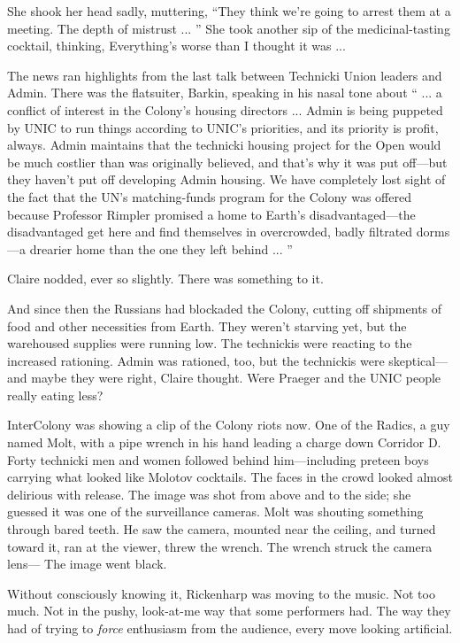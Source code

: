 She shook her head sadly, muttering, ``They think we're going to arrest them at a meeting. The depth of mistrust ... '' She took another sip of the medicinal-tasting cocktail, thinking, Everything's worse than I thought it was ...

The news ran highlights from the last talk between Technicki Union leaders and Admin. There was the flatsuiter, Barkin, speaking in his nasal tone about `` ... a conflict of interest in the Colony's housing directors ... Admin is being puppeted by UNIC to run things according to UNIC's priorities, and its priority is profit, always. Admin maintains that the technicki housing project for the Open would be much costlier than was originally believed, and that's why it was put off---but they haven't put off developing Admin housing. We have completely lost sight of the fact that the UN's matching-funds program for the Colony was offered because Professor Rimpler promised a home to Earth's disadvantaged---the disadvantaged get here and find themselves in overcrowded, badly filtrated dorms---a drearier home than the one they left behind ... ''

Claire nodded, ever so slightly. There was something to it.

And since then the Russians had blockaded the Colony, cutting off shipments of food and other necessities from Earth. They weren't starving yet, but the warehoused supplies were running low. The technickis were reacting to the increased rationing. Admin was rationed, too, but the technickis were skeptical---and maybe they were right, Claire thought. Were Praeger and the UNIC people really eating less?

InterColony was showing a clip of the Colony riots now. One of the Radics, a guy named Molt, with a pipe wrench in his hand leading a charge down Corridor D. Forty technicki men and women followed behind him---including preteen boys carrying what looked like Molotov cocktails. The faces in the crowd looked almost delirious with release. The image was shot from above and to the side; she guessed it was one of the surveillance cameras. Molt was shouting something through bared teeth. He saw the camera, mounted near the ceiling, and turned toward it, ran at the viewer, threw the wrench. The wrench struck the camera lens--- The image went black.

Without consciously knowing it, Rickenharp was moving to the music. Not too much. Not in the pushy, look-at-me way that some performers had. The way they had of trying to \textit{force} enthusiasm from the audience, every move looking artificial.

